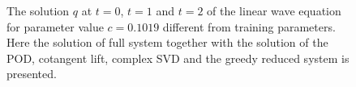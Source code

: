 \begin{figure}
\caption{The solution $q$ at $t=0$, $t=1$ and $t=2$ of the linear wave equation for parameter value $c= 0.1019$ different from training parameters. Here the solution of full system together with the solution of the POD, cotangent lift, complex SVD and the greedy reduced system is presented.}
\label{fig:NuRe:1}
\end{figure}

\begin{figure}

\begin{minipage}{.5\linewidth}
\centering
{}
\end{minipage}%
\begin{minipage}{.5\linewidth}
\centering
{}

\end{minipage}
\end{figure}

